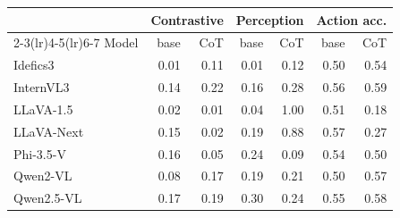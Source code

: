 \footnotesize
\setlength{\tabcolsep}{3.2pt}
\begin{tabular}{@{}lrrrrrr@{}}
\toprule
& \multicolumn{2}{c}{Contrastive} & \multicolumn{2}{c}{Perception} & \multicolumn{2}{c}{Action acc.} \\
\cmidrule(lr){2-3}\cmidrule(lr){4-5}\cmidrule(lr){6-7}
Model & base & CoT & base & CoT & base & CoT \\
\midrule
Idefics3 & 0.01 & 0.11 & 0.01 & 0.12 & 0.50 & 0.54 \\
InternVL3 & 0.14 & 0.22 & 0.16 & 0.28 & 0.56 & 0.59 \\
LLaVA-1.5 & 0.02 & 0.01 & 0.04 & 1.00 & 0.51 & 0.18 \\
LLaVA-Next & 0.15 & 0.02 & 0.19 & 0.88 & 0.57 & 0.27 \\
Phi-3.5-V & 0.16 & 0.05 & 0.24 & 0.09 & 0.54 & 0.50 \\
Qwen2-VL & 0.08 & 0.17 & 0.19 & 0.21 & 0.50 & 0.57 \\
Qwen2.5-VL & 0.17 & 0.19 & 0.30 & 0.24 & 0.55 & 0.58 \\
\bottomrule
\end{tabular}
